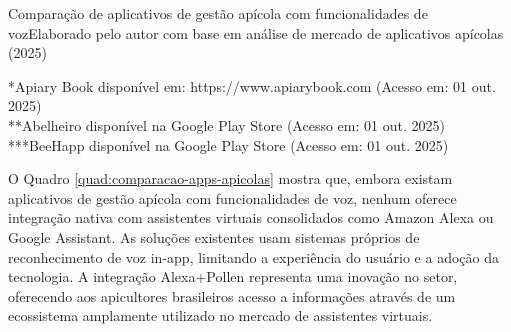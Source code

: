 \begin{quadro}{Comparação de aplicativos de gestão apícola com funcionalidades de voz}{Elaborado pelo autor com base em análise de mercado de aplicativos apícolas (2025)}
\label{quad:comparacao-apps-apicolas}
\renewcommand{\arraystretch}{1.5}
\raggedright
\small
*Apiary Book disponível em: https://www.apiarybook.com (Acesso em: 01 out. 2025)\\
**Abelheiro disponível na Google Play Store (Acesso em: 01 out. 2025)\\
***BeeHapp disponível na Google Play Store (Acesso em: 01 out. 2025)
\end{quadro}

O Quadro \ref{quad:comparacao-apps-apicolas} mostra que, embora existam aplicativos de gestão apícola com funcionalidades de voz, nenhum oferece integração nativa com assistentes virtuais consolidados como Amazon Alexa ou Google Assistant. As soluções existentes usam sistemas próprios de reconhecimento de voz in-app, limitando a experiência do usuário e a adoção da tecnologia. A integração Alexa+Pollen representa uma inovação no setor, oferecendo aos apicultores brasileiros acesso a informações através de um ecossistema amplamente utilizado no mercado de assistentes virtuais.